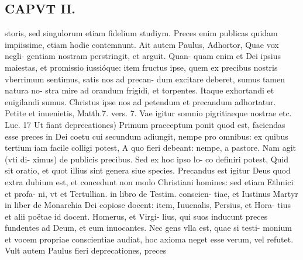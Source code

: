 \documentclass{article}
\begin{document}
\begin{pages}
\section*{CAPVT II. }
\marginpar{[ p.4I ]}storis, sed singulorum etiam fidelium studiym. Preces enim publicas quidam impiissime, etiam hodie contemnunt. \pstart Ait autem Paulus, Adhortor, Quae vox negli- gentiam nostram perstringit, et arguit. Quan- quam enim et Dei ipsius maiestas, et promissio iussióque: item fructus ipse, quem ex precibus nostris vberrimum sentimus, satis nos ad precan- dum excitare deberet, sumus tamen natura no- stra mire ad orandum frigidi, et torpentes. Itaque  exhortandi et euigilandi sumus. Christus ipse nos ad petendum et precandum adhortatur. Petite et inuenietis, Matth.7. vers. 7. Vae igitur somnio pigritiaeque nostrae etc. Luc. 17  \pend\pstart Ut fiant deprecationes) Primum praeceptum ponit quod est, faciendas esse preces in Dei coetu cui secundum adiungit, nempe pro omnibus: ex quibus tertium iam facile colligi potest, A quo fieri debeant: nempe, a pastore. Nam agit (vti di- ximus) de publicis precibus. Sed ex hoc ipso lo- co definiri potest, Quid sit oratio, et quot illius sint genera siue species. Precandus est igitur Deus quod extra dubium est, et concedunt non modo Christiani homines: sed etiam Ethnici et profa- ni, vt et Tertullian. in libro de Testim. conscien- tiae, et Iustinus Martyr in liber  de Monarchia Dei copiose docent: item, Iuuenalis, Persius, et Hora- tius et alii poëtae id docent. Homerus, et Virgi- lius, qui suos inducunt preces fundentes ad Deum, et eum inuocantes. Nec gens vlla est, quae si testi- monium et vocem propriae conscientiae audiat, hoc axioma neget esse verum, vel refutet.  \pend\pstart Vult autem Paulus fieri deprecationes, preces  \pend

\end{pages}
\end{document}
